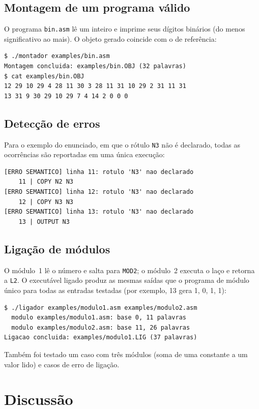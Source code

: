 \documentclass[conference]{IEEEtran}
\begin{document}
\subsection{Montagem de um programa válido}
O programa \texttt{bin.asm} lê um inteiro e imprime seus dígitos binários (do menos significativo ao mais). O objeto gerado coincide com o de referência:
\begin{lstlisting}
$ ./montador examples/bin.asm
Montagem concluida: examples/bin.OBJ (32 palavras)
$ cat examples/bin.OBJ
12 29 10 29 4 28 11 30 3 28 11 31 10 29 2 31 11 31
13 31 9 30 29 10 29 7 4 14 2 0 0 0
\end{lstlisting}

\subsection{Detecção de erros}
Para o exemplo do enunciado, em que o rótulo \texttt{N3} não é declarado, todas as ocorrências são reportadas em uma única execução:
\begin{lstlisting}
[ERRO SEMANTICO] linha 11: rotulo 'N3' nao declarado
    11 | COPY N2 N3
[ERRO SEMANTICO] linha 12: rotulo 'N3' nao declarado
    12 | COPY N3 N3
[ERRO SEMANTICO] linha 13: rotulo 'N3' nao declarado
    13 | OUTPUT N3
\end{lstlisting}

\subsection{Ligação de módulos}
O módulo~1 lê o número e salta para \texttt{MOD2}; o módulo~2 executa o laço e retorna a \texttt{L2}. O executável ligado produz as mesmas saídas que o programa de módulo único para todas as entradas testadas (por exemplo, 13 gera 1, 0, 1, 1):
\begin{lstlisting}
$ ./ligador examples/modulo1.asm examples/modulo2.asm
  modulo examples/modulo1.asm: base 0, 11 palavras
  modulo examples/modulo2.asm: base 11, 26 palavras
Ligacao concluida: examples/modulo1.LIG (37 palavras)
\end{lstlisting}
Também foi testado um caso com três módulos (soma de uma constante a um valor lido) e casos de erro de ligação.

\section{Discussão}
\end{document}
